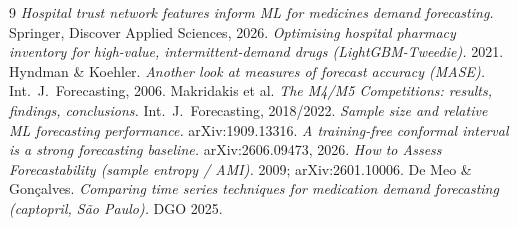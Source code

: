 \documentclass[11pt,a4paper]{article}
\begin{document}
{\footnotesize
\begin{thebibliography}{9}
\setlength{\itemsep}{0pt}
 \emph{Hospital trust network features inform ML for medicines demand forecasting.} Springer, Discover Applied Sciences, 2026.
 \emph{Optimising hospital pharmacy inventory for high-value, intermittent-demand drugs (LightGBM-Tweedie).} 2021.
 Hyndman \& Koehler. \emph{Another look at measures of forecast accuracy (MASE).} Int.\ J.\ Forecasting, 2006.
 Makridakis et al. \emph{The M4/M5 Competitions: results, findings, conclusions.} Int.\ J.\ Forecasting, 2018/2022.
 \emph{Sample size and relative ML forecasting performance.} arXiv:1909.13316.
 \emph{A training-free conformal interval is a strong forecasting baseline.} arXiv:2606.09473, 2026.
 \emph{How to Assess Forecastability (sample entropy / AMI).} 2009; arXiv:2601.10006.
 De Meo \& Gonçalves. \emph{Comparing time series techniques for medication demand forecasting (captopril, São Paulo).} DGO 2025.
\end{thebibliography}
}
\end{document}
